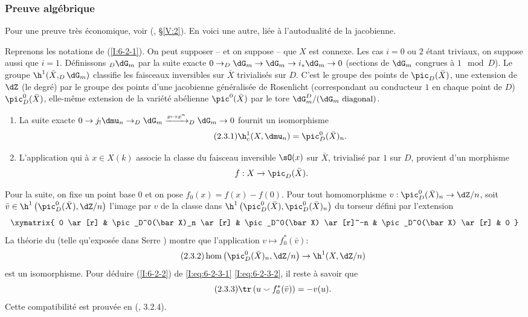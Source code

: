 \subsubsection{Preuve algébrique}\label{I:6-2-3}

Pour une preuve très économique, voir (, \S\ref{V:2}). 
En voici une autre, liée à l'autodualité de la jacobienne. 

Reprenons les notations de (\ref{I:6-2-1}). On peut supposer -- et on suppose -- 
que $X$ est connexe. Les cas $i=0$ ou $2$ étant triviaux, on suppose aussi 
que $i=1$. Définissons $_D\dG_m$ par la suite exacte 
$0\to _D\dG_m \to \dG_m \to i_*\dG_m\to 0$ (sections de $\dG_m$ congrues à 
$1\mod D$). Le groupe $\h^1(\bar X, _D\dG_m)$ classifie les faisceaux 
inversibles sur $\bar X$ trivialisés sur $D$. C'est le groupe des points de 
$\pic_D(\bar X)$, une extension de $\dZ$ (le degré) par le groupe des points 
d'une jacobienne généralisée de Rosenlicht (correspondant au conducteur 
$1$ en chaque point de $D$) $\pic_D^0(\bar X)$, elle-même extension de la 
variété abélienne $\pic^0(\bar X)$ par le tore 
$\dG_m^D/(\text{$\dG_m$ diagonal})$. 

\begin{enumerate}[\indent a)]
  \item {}La suite exacte 
    $0\to j_!\dmu_n \to _D\dG_m \xrightarrow{x\mapsto x^n} _D\dG_m\to 0$ fournit un 
    isomorphisme 
    \begin{equation*}\tag{2.3.1}\label{I:eq:6-2-3-1}
      \h_c^1(X,\dmu_n) = \pic_D^0(\bar X)_n \text{.}
    \end{equation*}
  \item L'application qui à $x\in X(k)$ associe la classe du faisceau 
    inversible $\sO(x)$ sur $\bar X$, trivialisé par $1$ sur $D$, provient 
    d'un morphisme 
    \[
      f:X \to \pic_D(\bar X) \text{.}
    \]
\end{enumerate}
Pour la suite, on fixe un point base $0$ et on pose $f_0(x)=f(x)-f(0)$. Pour 
tout homomorphisme $v:\pic_D^0(\bar X)_n \to \dZ/n$, soit 
$\bar v\in \h^1\left(\pic_D^0(\bar X),\dZ/n\right)$ l'image par $v$ de la classe 
dans $\h^1\left(\pic_D^0(\bar X),\pic_D^0(\bar X)_n\right)$ du torseur défini 
par l'extension 
\[\xymatrix{
  0 \ar[r] 
    & \pic_D^0(\bar X)_n \ar[r] 
    & \pic_D^0(\bar X) \ar[r]^-n 
    & \pic_D^0(\bar X) \ar[r] 
    & 0
}\]
La théorie du  (telle qu'exposée dans 
Serre ) montre que l'application $v\mapsto f_0^*(\bar v)$: 
\begin{equation*}\tag{2.3.2}\label{I:eq:6-2-3-2}
  \hom\left(\pic_D^0(\bar X)_n,\dZ/n\right) \to \h^1(X,\dZ/n)
\end{equation*}
est un isomorphisme. Pour déduire (\ref{I:6-2-2}) de \eqref{I:eq:6-2-3-1} 
\eqref{I:eq:6-2-3-2}, il reste à savoir que 
\begin{equation*}\tag{2.3.3}\label{I:eq:6-2-3-3}
  \tr\left(u \smallsmile f_0^*(\bar v)\right) = -v(u) \text{.}
\end{equation*}
Cette compatibilité est prouvée en (, 3.2.4).

